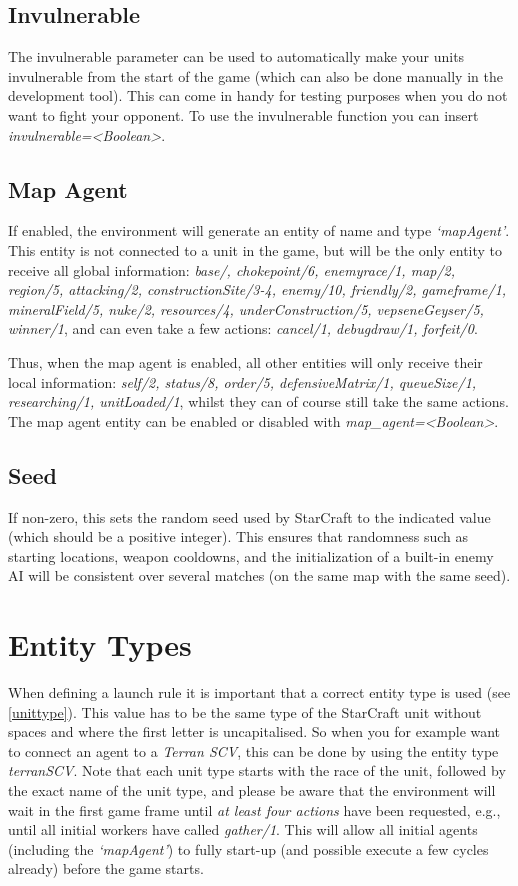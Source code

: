 \subsection{Invulnerable}
\label{invulnerable}
The invulnerable parameter can be used to automatically make your units invulnerable from the start of the game (which can also be done manually in the development tool). This can come in handy for testing purposes when you do not want to fight your opponent. To use the invulnerable function you can insert \textit{invulnerable=<Boolean>}.

\subsection{Map Agent}
\label{map agent}
If enabled, the environment will generate an entity of name and type \textit{`mapAgent'}. This entity is not connected to a unit in the game, but will be the only entity to receive all global information: \textit{base/, chokepoint/6, enemyrace/1, map/2, region/5, attacking/2, constructionSite/3-4, enemy/10, friendly/2, gameframe/1, mineralField/5, nuke/2, resources/4, underConstruction/5, vepseneGeyser/5, winner/1}, and can even take a few actions: \textit{cancel/1, debugdraw/1, forfeit/0}. 

Thus, when the map agent is enabled, all other entities will only receive their local information: \textit{self/2, status/8, order/5, defensiveMatrix/1, queueSize/1, researching/1, unitLoaded/1}, whilst they can of course still take the same actions. The map agent entity can be enabled or disabled with \textit{map\_agent=<Boolean>}.

\subsection{Seed}
If non-zero, this sets the random seed used by StarCraft to the indicated value (which should be a positive integer). This ensures that randomness such as starting locations, weapon cooldowns, and the initialization of a built-in enemy AI will be consistent over several matches (on the same map with the same seed).

\section{Entity Types}
When defining a launch rule it is important that a correct entity type is used (see \ref{unittype}). This value has to be the same type of the StarCraft unit without spaces and where the first letter is uncapitalised. So when you for example want to connect an agent to a \textit{Terran SCV}, this can be done by using the entity type \textit{terranSCV}. Note that each unit type starts with the race of the unit, followed by the exact name of the unit type, and please be aware that the environment will wait in the first game frame until \textit{at least four actions} have been requested, e.g., until all initial workers have called \textit{gather/1}. This will allow all initial agents (including the \textit{`mapAgent'}) to fully start-up (and possible execute a few cycles already) before the game starts.

